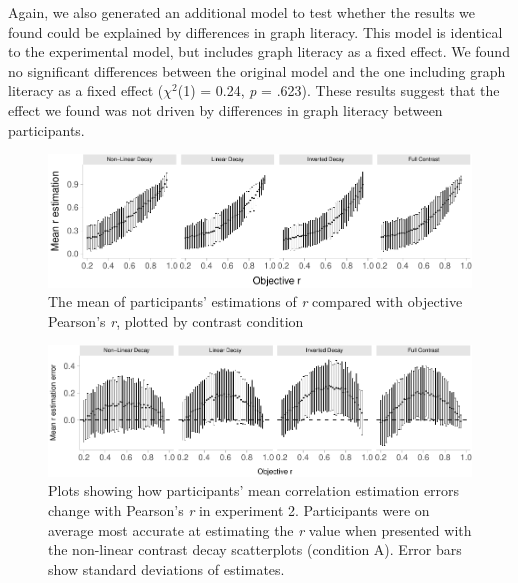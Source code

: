 \documentclass[preprint, 3p,
authoryear]{elsarticle} %
\begin{document}
Again, we also generated an additional model to test whether the results
we found could be explained by differences in graph literacy. This model
is identical to the experimental model, but includes graph literacy as a
fixed effect. We found no significant differences between the original
model and the one including graph literacy as a fixed effect
(\(\chi^2\)(1) = 0.24, \emph{p} = .623). These results suggest that the
effect we found was not driven by differences in graph literacy between
participants.

\begin{figure}

{\centering \includegraphics{contrast_and_scatterplots_files/figure-latex/e2-error-plot-1} 

}

\caption{\label{e2-error-plot}The mean of participants' estimations of \textit{r} compared with objective Pearson's \textit{r}, plotted by contrast condition}\label{fig:e2-error-plot}
\end{figure}

\begin{figure}

{\centering \includegraphics{contrast_and_scatterplots_files/figure-latex/changes-with-r-e2-1} 

}

\caption{\label{e2-changes-plot}Plots showing how participants' mean correlation estimation errors change with Pearson's \textit{r} in experiment 2. Participants were on average most accurate at estimating the \textit{r} value when presented with the non-linear contrast decay scatterplots (condition A). Error bars show standard deviations of estimates.}\label{fig:changes-with-r-e2}
\end{figure}
\end{document}
